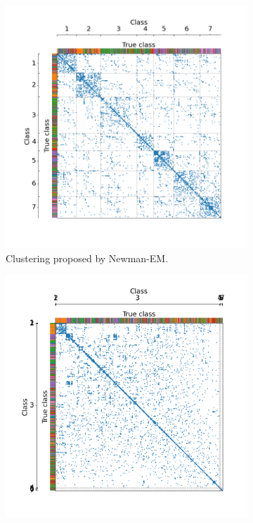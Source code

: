 \documentclass[switch, 12pt]{article}
\begin{document}
\begin{figure}[H]
    \medskip

    \hfill
    \begin{subfigure}{0.45\linewidth}
        \centering
        \includegraphics[width=\linewidth, trim={45 25 35 40}, clip]{figures/cora_Newman.png}
        \caption{Clustering proposed by Newman-EM.}
        \label{fig:cora_newman}
    \end{subfigure}
    \hfill
    \begin{subfigure}{0.45\linewidth}
        \centering
        \includegraphics[width=\linewidth, trim={45 25 35 40}, clip]{figures/cora_spetral.png}

\end{subfigure}
\end{figure}
\end{document}
